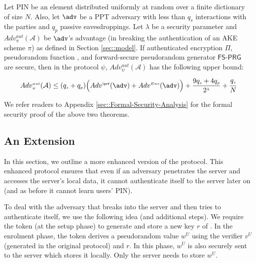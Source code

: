 \documentclass[runningheads]{llncs}
\newcommand{\sss}{\scriptscriptstyle}
\renewcommand{\verifier}{\ensuremath{{v}}}
\newcommand{\VC}[1]{\ensuremath{#1^{\sss U}}}
\newcommand{\A}{\mathcal{A}}
\begin{document}
\begin{theorem} [Authentication]
Let PIN be an element distributed uniformly at random over a finite dictionary of size $N$. Also, 
let $\adv$ be a PPT adversary with less than $q_s$ interactions with the parties and $q_p$ passive eavesdroppings. Let $\lambda$ be a security parameter and $Adv_{\sss\pi}^{\sss aut}(\A)$ be  $\adv$'s advantage (in breaking the authentication of an AKE scheme $\pi$) as defined in Section \ref{sec::model}.  If authenticated encryption $\Pi$, pseudorandom function \prf,  and forward-secure pseudorandom generator  $\mathsf{FS\text{-}PRG}$ are secure, then in the protocol $\psi$, $Adv_{\sss \psi}^{\sss aut}(\A)$ has the following upper bound:  
%
\vspace{-3mm}
  \begin{equation*}
 Adv_{\sss \psi}^{\sss aut}(\A)  \leq (q_{\sss s} + q_{\sss p})\Big(Adv^{\sss\prf}(\adv)+Adv^{\sss Enc}(\adv)\Big)+\frac{9q_{\sss s}+4q_{\sss p}}{2^{\sss\lambda}}+  \cfrac{q_{\sss s}}{N}
 \end{equation*}
%
\end{theorem}





We refer readers to Appendix \ref{sec::Formal-Security-Analysis} for the formal security proof of the above two theorems. 

\subsection{An Extension}


In this section, we outline a more enhanced version of the protocol. This enhanced protocol ensures that even if an adversary penetrates the server and accesses the server's local data, it cannot authenticate itself to the server later on (and as before it cannot learn users' PIN). 


To deal with the adversary that breaks into the server and then tries to authenticate itself, we use the following idea (and additional steps). We require the token (at the setup phase) to generate and store a new key $r$ of \prf.  In the enrolment phase, the token derives a pseudorandom value $w^{\sss U}$ using the verifier \VC{\verifier} (generated in the original protocol) and $r$. In this phase, $w^{\sss U}$ is also securely sent to the server which stores it locally. Only the server needs to store $w^{\sss U}$. 
\end{document}
